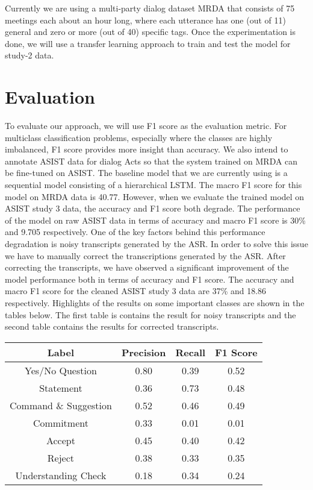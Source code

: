 Currently we are using a multi-party dialog dataset MRDA
\citep{Shriberg.ea:2004} that consists of 75 meetings each about an hour long,
where each utterance has one (out of 11) general and zero or more (out of 40)
specific tags. Once the experimentation is done, we will use a transfer
learning approach to train and test the model for study-2 data. 

\section{Evaluation}

To evaluate our approach, we will use F1 score as the evaluation metric. For
multiclass classification problems, especially where the classes are highly
imbalanced, F1 score provides more insight than accuracy.  We also intend to
annotate ASIST data for dialog Acts so that the system trained on MRDA can be
fine-tuned on ASIST. The baseline model that we are currently using is a sequential
model consisting of a hierarchical LSTM. The macro F1 score for this model on MRDA
data is 40.77. However, when we evaluate the trained model on ASIST study 3 data, 
the accuracy and F1 score both degrade. The performance of the model on raw ASIST
data in terms of accuracy and macro F1 score is 30\% and 9.705 respectively. 
One of the key factors behind this performance degradation is noisy transcripts 
generated by the ASR. In order to solve this issue we have to manually correct the
transcriptions generated by the ASR. After correcting the transcripts, we have
observed a significant improvement of the model performance both in terms of accuracy
and F1 score. The accuracy and macro F1 score for the cleaned ASIST study 3 data are 
37\% and 18.86 respectively. Highlights of the results on some important classes are 
shown in the tables below. The first table is contains the result for noisy transcripts 
and the second table contains the results for corrected transcripts.

\begin{center}
\begin{tabular}{||c c c c||}
 \hline
 Label & Precision & Recall & F1 Score\\ [0.5ex]
 \hline\hline
 Yes/No Question & 0.80 & 0.39  & 0.52\\
 \hline
 Statement & 0.36 & 0.73 & 0.48\\
 \hline
 Command \& Suggestion & 0.52 & 0.46 & 0.49\\
 \hline
 Commitment & 0.33 & 0.01 & 0.01\\
 \hline
 Accept & 0.45 & 0.40 &  0.42 \\
 \hline
  Reject & 0.38 & 0.33 & 0.35\\
 \hline
  Understanding Check & 0.18 & 0.34 & 0.24\\
 \hline
\end{tabular}
\end{center}

